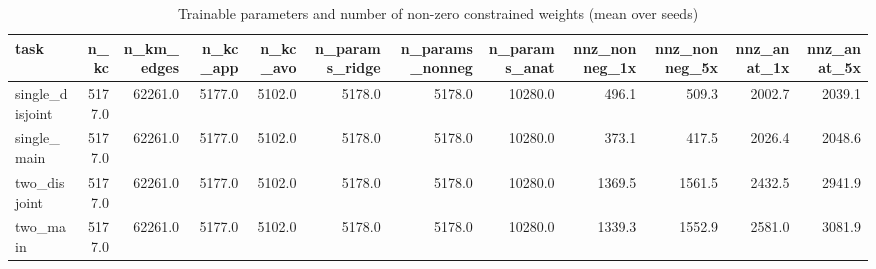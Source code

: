 \begin{table}[t]
\centering
\small
\begin{tabular}{lrrrrrrrrrrr}
\toprule
task & n\_kc & n\_km\_edges & n\_kc\_app & n\_kc\_avo & n\_params\_ridge & n\_params\_nonneg & n\_params\_anat & nnz\_nonneg\_1x & nnz\_nonneg\_5x & nnz\_anat\_1x & nnz\_anat\_5x \\
\midrule
single\_disjoint & 5177.0 & 62261.0 & 5177.0 & 5102.0 & 5178.0 & 5178.0 & 10280.0 & 496.1 & 509.3 & 2002.7 & 2039.1 \\
single\_main & 5177.0 & 62261.0 & 5177.0 & 5102.0 & 5178.0 & 5178.0 & 10280.0 & 373.1 & 417.5 & 2026.4 & 2048.6 \\
two\_disjoint & 5177.0 & 62261.0 & 5177.0 & 5102.0 & 5178.0 & 5178.0 & 10280.0 & 1369.5 & 1561.5 & 2432.5 & 2941.9 \\
two\_main & 5177.0 & 62261.0 & 5177.0 & 5102.0 & 5178.0 & 5178.0 & 10280.0 & 1339.3 & 1552.9 & 2581.0 & 3081.9 \\
\bottomrule
\end{tabular}
\caption{Trainable parameters and number of non-zero constrained weights (mean over seeds)}
\label{tab:constrained_params}
\end{table}